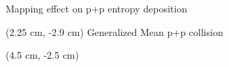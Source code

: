 \documentclass[svgnames]{beamer}
\begin{document}
\begin{frame}[label=ppoverlap]{Mapping effect on p+p entropy deposition}
  \begin{textblock*}{\linewidth}(2.25 cm, -2.9 cm)
    \centering Generalized Mean p+p collision 
  \end{textblock*}

 
  \begin{textblock*}{\linewidth}(4.5 cm, -2.5 cm)

\end{textblock*}
\end{frame}
\end{document}
